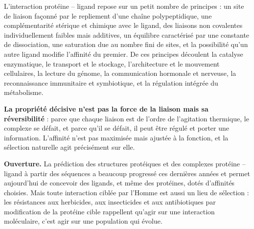 \documentclass[11pt,a4paper]{article}
\begin{document}
L'interaction protéine -- ligand repose sur un petit nombre de principes : un site de liaison façonné par le repliement d'une chaîne polypeptidique, une complémentarité stérique et chimique avec le ligand, des liaisons non covalentes individuellement faibles mais additives, un équilibre caractérisé par une constante de dissociation, une saturation due au nombre fini de sites, et la possibilité qu'un autre ligand modifie l'affinité du premier. De ces principes découlent la catalyse enzymatique, le transport et le stockage, l'architecture et le mouvement cellulaires, la lecture du génome, la communication hormonale et nerveuse, la reconnaissance immunitaire et symbiotique, et la régulation intégrée du métabolisme.

\textbf{La propriété décisive n'est pas la force de la liaison mais sa réversibilité} : parce que chaque liaison est de l'ordre de l'agitation thermique, le complexe se défait, et parce qu'il se défait, il peut être régulé et porter une information. L'affinité n'est pas maximisée mais ajustée à la fonction, et la sélection naturelle agit précisément sur elle.

\textbf{Ouverture.} La prédiction des structures protéiques et des complexes protéine -- ligand à partir des séquences a beaucoup progressé ces dernières années et permet aujourd'hui de concevoir des ligands, et même des protéines, dotés d'affinités choisies. Mais toute interaction ciblée par l'Homme est aussi un lieu de sélection : les résistances aux herbicides, aux insecticides et aux antibiotiques par modification de la protéine cible rappellent qu'agir sur une interaction moléculaire, c'est agir sur une population qui évolue.
\end{document}
